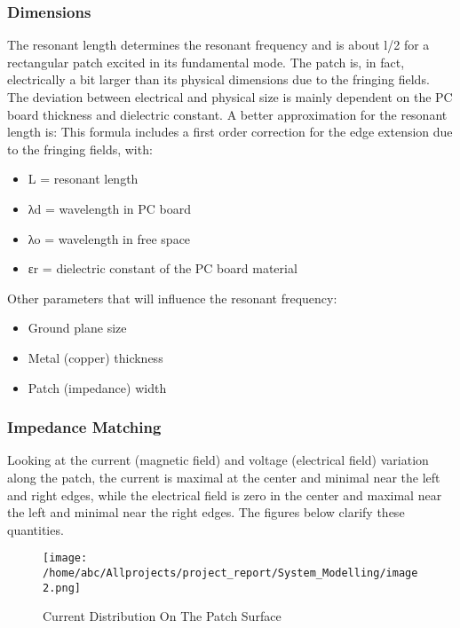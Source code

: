   \subsubsection{Dimensions}\label{sub:Dimensions}
	   \justify
	    The resonant length determines the resonant frequency and is about l/2 for a rectangular patch excited in its fundamental mode. The patch is, in fact, electrically a bit larger than its physical dimensions due to the fringing fields. The deviation between electrical and physical size is mainly dependent on the PC board thickness and dielectric constant.
	    A better approximation for the resonant length is:
	   \justify
	    This formula includes a first order correction for the edge extension due to the fringing fields, with:
	     \begin{itemize}
	       \item   L = resonant length
	       \item λd = wavelength in PC board
	       \item λo = wavelength in free space
	       \item εr = dielectric constant of the PC board material

	     \end{itemize}

	     Other parameters that will influence the resonant frequency:

	     \begin{itemize}
	       \item Ground plane size
	       \item Metal (copper) thickness
	       \item  Patch (impedance) width
	     \end{itemize}

    \subsubsection{Impedance Matching}\label{sub:Impedance Matching}
     \justify
      Looking at the current (magnetic field) and voltage (electrical field) variation along the  patch, the current is maximal at the center and minimal near the left and right edges, while the electrical field is zero in the center and maximal near the left and minimal near the right edges.  The figures below clarify these quantities.

         \begin{figure}[h]
         	\centering
	         	\texttt{[image: /home/abc/Allprojects/project\_report/System\_Modelling/image2.png]}
	         	\caption{Current Distribution On The Patch Surface}
         \end{figure}



